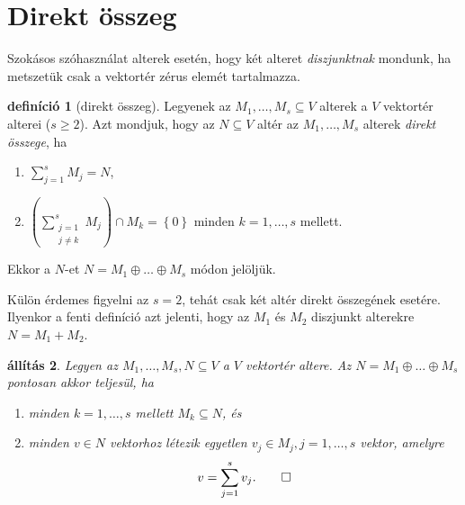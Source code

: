 \documentclass[9pt, a4paper, showtrims]{memoir}
\theoremstyle{plain}
\newtheorem{proposition}{állítás}[chapter]
\theoremstyle{remark}
\theoremstyle{definition}
\newtheorem{definition}[proposition]{definíció}
\begin{document}
\section{Direkt összeg}
Szokásos szóhasználat alterek esetén, hogy két alteret \emph{diszjunktnak}
mondunk,
ha metszetük csak a vektortér zérus elemét tartalmazza.
\begin{definition}[direkt összeg]
    Legyenek az $M_1,\dots,M_s\subseteq V$ alterek a $V$ vektortér alterei ($s\geq 2$).
    Azt mondjuk, hogy az $N\subseteq V$ altér az $M_1,\dots,M_s$ alterek \emph{direkt összege},
    ha
    \begin{enumerate}
        \item $\sum_{j=1}^sM_j=N$,
        \item $\left( \sum_{\substack{j=1\\j\neq k}}^sM_j \right)\cap M_k
            =
            \left\{ 0 \right\}$ 
            minden $k=1,\dots,s$ mellett.
    \end{enumerate}
    Ekkor a $N$-et $N=M_1\oplus\dots\oplus M_s$ módon jelöljük.
\end{definition}
Külön érdemes figyelni az $s=2$, tehát csak két altér direkt összegének esetére.
Ilyenkor a fenti definíció azt jelenti, 
hogy az $M_1$ és $M_2$ diszjunkt alterekre $N=M_1+M_2$.
\begin{proposition}
    Legyen az $M_1,\dots,M_s,N\subseteq V$ a $V$ vektortér altere. 
    Az $N=M_1\oplus\dots\oplus M_s$ pontosan akkor teljesül,
    ha 
    \begin{enumerate}
        \item minden $k=1,\dots,s$ mellett $M_k\subseteq N$, és
        \item 
            minden $v\in N$ vektorhoz létezik egyetlen $v_j\in M_j, j=1,\dots,s$ 
            vektor, amelyre
            \[
                v=\sum_{j=1}^sv_j.\qedhere
            \]
    \end{enumerate}
\end{proposition}
\end{document}
